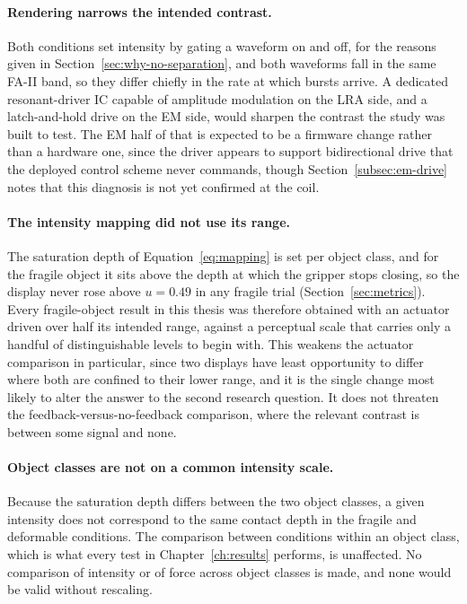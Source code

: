 \documentclass[12pt, a4paper, twoside, openright]{report}
\begin{document}
\paragraph{Rendering narrows the intended contrast.} Both conditions set
intensity by gating a waveform on and off, for the reasons given in
Section~\ref{sec:why-no-separation}, and both waveforms fall in the same
FA-II band, so they differ chiefly in the rate at which bursts arrive. A
dedicated resonant-driver IC capable of amplitude modulation on the LRA side,
and a latch-and-hold drive on the EM side, would sharpen the contrast the study
was built to test. The EM half of that is expected to be a firmware change
rather than a hardware one, since the driver appears to support bidirectional
drive that the deployed control scheme never commands, though
Section~\ref{subsec:em-drive} notes that this diagnosis is not yet confirmed
at the coil.

\paragraph{The intensity mapping did not use its range.} The saturation depth
of Equation~\eqref{eq:mapping} is set per object class, and for the fragile
object it sits above the depth at which the gripper stops closing, so the
display never rose above $u = 0.49$ in any fragile trial
(Section~\ref{sec:metrics}). Every fragile-object result in this thesis was
therefore obtained with an actuator driven over half its intended range,
against a perceptual scale that carries only a handful of distinguishable
levels to begin with. This weakens the actuator comparison in particular, since
two displays have least opportunity to differ where both are confined to their
lower range, and it is the single change most likely to alter the answer to the
second research question. It does not threaten the feedback-versus-no-feedback
comparison, where the relevant contrast is between some signal and none.

\paragraph{Object classes are not on a common intensity scale.} Because the
saturation depth differs between the two object classes, a given intensity does
not correspond to the same contact depth in the fragile and deformable
conditions. The comparison between conditions within an object class, which is
what every test in Chapter~\ref{ch:results} performs, is unaffected. No
comparison of intensity or of force across object classes is made, and none
would be valid without rescaling.
\end{document}
